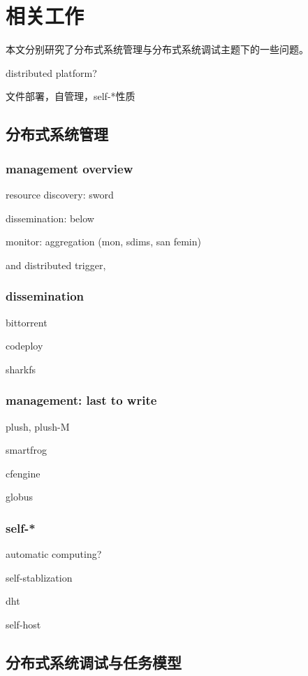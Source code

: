 \chapter{相关工作}
\label{chap:related}

本文分别研究了分布式系统管理与分布式系统调试主题下的一些问题。

distributed platform?

文件部署，自管理，self-*性质

\section{分布式系统管理}

\subsection{management overview}

resource discovery: sword

dissemination: below

monitor: aggregation (mon, sdims, san femin)

and distributed trigger, 

\subsection{dissemination}

bittorrent

codeploy

sharkfs

\subsection{management: last to write}

plush, plush-M

smartfrog

cfengine

globus

\subsection{self-*}

automatic computing?

self-stablization

dht

self-host

\section{分布式系统调试与任务模型}

